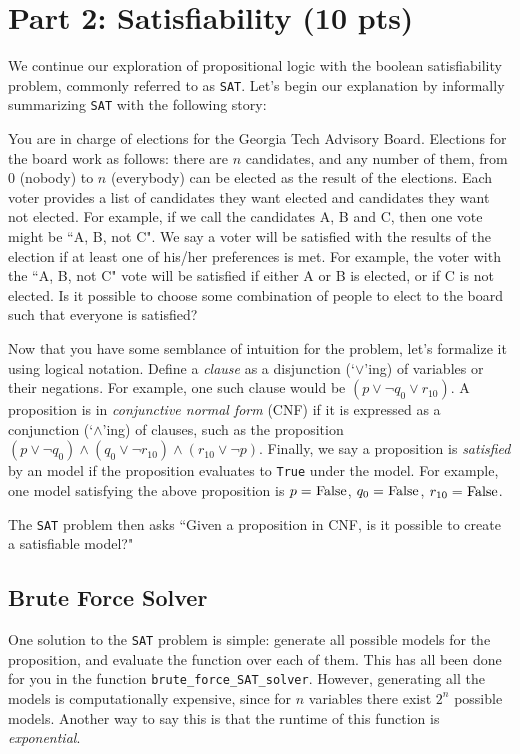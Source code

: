 \documentclass{article}
\begin{document}
\section*{Part 2: Satisfiability (10 pts)}
    We continue our exploration of propositional logic with the boolean satisfiability problem, commonly referred to as \verb+SAT+. Let's begin our explanation by informally summarizing \verb+SAT+ with the following story:
    \begin{tcolorbox}[colback=red!10]
        You are in charge of elections for the Georgia Tech Advisory Board. Elections for the board work as follows: there are $n$ candidates, and any number of them, from 0 (nobody) to $n$ (everybody) can be elected as the result of the elections. Each voter provides a list of candidates they want elected and candidates they want not elected. For example, if we call the candidates A, B and C, then one vote might be ``A, B, not C". We say a voter will be satisfied with the results of the election if at least one of his/her preferences is met. For example, the voter with the ``A, B, not C" vote will be satisfied if either A or B is elected, or if C is not elected. Is it possible to choose some combination of people to elect to the board such that everyone is satisfied? 
    \end{tcolorbox}
    Now that you have some semblance of intuition for the problem, let's formalize it using logical notation. Define a \textit{clause} as a disjunction (`$\lor$'ing) of variables or their negations. For example, one such clause would be $(p \lor \neg q_{0} \lor r_{10})$. A proposition is in \textit{conjunctive normal form} (CNF) if it is expressed as a conjunction (`$\land$'ing) of clauses, such as the proposition $(p \lor \neg q_{0}) \land (q_{0} \lor \neg r_{10}) \land (r_{10} \lor \neg p)$. Finally, we say a proposition is \textit{satisfied} by an model if the proposition evaluates to \lstinline{True} under the model. For example, one model satisfying the above proposition is $p = \text{\lstinline{False}}$, $q_{0} = \text{\lstinline{False}}$, $r_{10} = \text{\lstinline{False}}$.

    \vspace{2mm}
    The \lstinline{SAT} problem then asks ``Given a proposition in CNF, is it possible to create a satisfiable model?"

\subsection*{Brute Force Solver}
        One solution to the \lstinline{SAT} problem is simple: generate all possible models for the proposition, and evaluate the function over each of them. This has all been done for you in the function \lstinline{brute_force_SAT_solver}. However, generating all the models is computationally expensive, since for $n$ variables there exist $2^{n}$ possible models. Another way to say this is that the runtime of this function is \textit{exponential}.
\end{document}
